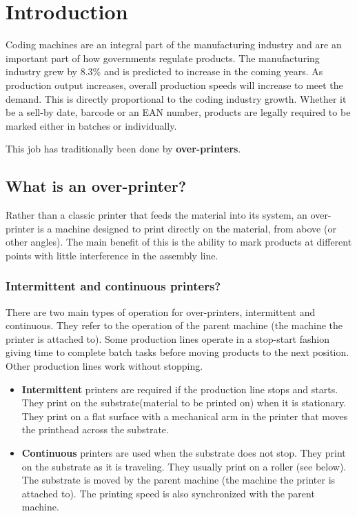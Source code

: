 \chapter{Introduction}
\pagestyle{fancy}

Coding machines are an integral part of the manufacturing industry and are an important part of how governments regulate products. The manufacturing industry grew by 8.3\% and is predicted to increase in the coming years.
As production output increases, overall production speeds will increase to meet the demand. This is directly proportional to the coding industry growth. Whether it be a sell-by date, barcode or an EAN number, products are legally required to be marked either in batches or individually. 

\bigskip
This job has traditionally been done by \textbf{over-printers}.


\bigskip

\section{What is an over-printer?}

Rather than a classic printer that feeds the material into its system, an over-printer is a machine designed to print directly on the material, from above (or other angles). The main benefit of this is the ability to mark products at different points with little interference in the assembly line.

\subsection{Intermittent and continuous printers?}

There are two main types of operation for over-printers, intermittent and continuous. They refer to the operation of the parent machine (the machine the printer is attached to). Some production lines operate in a stop-start fashion giving time to complete batch tasks before moving products to the next position. Other production lines work without stopping.

\begin{itemize}
    \item \textbf{Intermittent} printers are required if the production line stops and starts. They print on the substrate(material to be printed on) when it is stationary. They print on a flat surface with a mechanical arm in the printer that moves the printhead across the substrate.
    \item \textbf{Continuous} printers are used when the substrate does not stop. They print on the substrate as it is traveling. They usually print on a roller (see below). The substrate is moved by the parent machine (the machine the printer is attached to). The printing speed is also synchronized with the parent machine.
\end{itemize}

